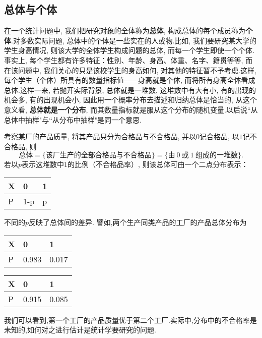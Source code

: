 \subsection{总体与个体\label{5.1.1}}
在一个统计问题中, 我们把研究对象的全体称为\textbf{总体}, 构成总体的每个成员称为\textbf{个体}.对多数实际问题, 总体中的个体是一些实在的人或物.比如, 我们要研究某大学的学生身高情况, 则该大学的全体学生构成问题的总体, 而每一个学生即使一个个体.事实上, 每个学生都有许多特征：性别、年龄、身高、体重、名字、籍贯等等, 而在该问题中, 我们关心的只是该校学生的身高如何, 对其他的特征暂不予考虑.这样, 每个学生（个体）所具有的数量指标值——身高就是个体, 而将所有身高全体看成总体.这样一来, 若抛开实际背景, 总体就是一堆数, 这堆数中有大有小, 有的出现的机会多, 有的出现机会小, 因此用一个概率分布去描述和归纳总体是恰当的, 从这个意义看, \textbf{总体就是一个分布}, 而其数量指标就是服从这个分布的随机变量.以后说``从总体中抽样"与``从分布中抽样"是同一个意思.
\begin{example}
考察某厂的产品质量, 将其产品只分为合格品与不合格品, 并以$0$记合格品, 以$1$记不合格品, 则
\[\text{总体}=\{\text{该厂生产的全部合格品与不合格品}\}=\{\text{由}~0~\text{或}~1~\text{组成的一堆数}\}.\]
若以$p$表示这堆数中$1$的比例（不合格品率）, 则该总体可由一个二点分布表示：
\begin{center}
\begin{tabularx}{0.4\textwidth}{Y|YY}
  X&0&1\\
  \midrule
  P&1-p&p
  \end{tabularx}
\end{center}
不同的$p$反映了总体间的差异. 譬如,两个生产同类产品的工厂的产品总体分布为

\begin{minipage}{0.4\textwidth}
\centering
\begin{tabularx}{\textwidth}{Y|YY}
X&0&1\\
\midrule
P&0.983&0.017
\end{tabularx}
\end{minipage}\hspace{3\ccwd}
\begin{minipage}{0.4\textwidth}
\centering
\begin{tabularx}{\textwidth}{Y|YY}
X&0&1\\
\midrule
P&0.915&0.085
\end{tabularx}
\end{minipage}

我们可以看到,第一个工厂的产品质量优于第二个工厂.实际中,分布中的不合格率是未知的,如何对之进行估计是统计学要研究的问题.
\end{example}
